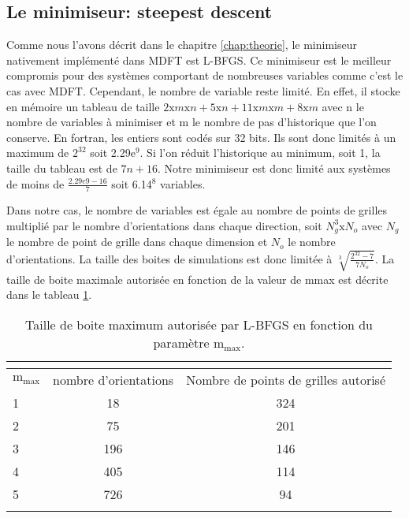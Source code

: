\subsection{Le minimiseur: steepest descent}
Comme nous l'avons décrit dans le chapitre \ref{chap:theorie}, le minimiseur nativement implémenté dans MDFT est L-BFGS. Ce minimiseur est le meilleur compromis pour des systèmes comportant de nombreuses variables comme c'est le cas avec MDFT. Cependant, le nombre de variable reste limité. En effet, il stocke en mémoire un tableau de taille $2\mathrm{x}m\mathrm{x}n + 5\mathrm{x}n + 11\mathrm{x}m\mathrm{x}m + 8\mathrm{x}m$ avec n le nombre de variables à minimiser et m le nombre de pas d'historique que l'on conserve. En fortran, les entiers sont codés sur 32 bits. Ils sont donc limités à un maximum de $2^{32}$ soit 2.29e$^9$. Si l'on réduit l'historique au minimum, soit 1, la taille du tableau est de $7n+16$. Notre minimiseur est donc limité aux systèmes de moins de $\frac{2.29e9-16}{7}$ soit 6.14$^{8}$ variables. 

Dans notre cas, le nombre de variables est égale au nombre de points de grilles multiplié par le nombre d'orientations dans chaque direction, soit $N_g^3 \mathrm{x} N_o$ avec $N_g$ le nombre de point de grille dans chaque dimension et $N_o$ le nombre d'orientations. La taille des boites de simulations est donc limitée à $\sqrt[3]{\frac{2^{32}-7}{7N_o}}$. La taille de boite maximale autorisée en fonction de la valeur de mmax est décrite dans le tableau \ref{tab:taille_boite_max}.



\begin{table}[H]
 \centering
  \begin{tabular}{l | c | c }
    \hline \multicolumn{3}{c}{} \\[-1em]\hline
    $\mathrm{m}_\mathrm{max}$ & nombre d'orientations & Nombre de points de grilles autorisé \\
    \hline
    1  & 18 & 324 \\
    2  & 75 & 201 \\
    3  & 196 & 146 \\
    4  & 405 & 114 \\
    5  & 726 & 94 \\
    \hline \multicolumn{3}{c}{} \\[-1em]\hline
  \end{tabular}
  \caption{Taille de boite maximum autorisée par L-BFGS en fonction du paramètre $\mathrm{m}_\mathrm{max}$.}
  \label{tab:taille_boite_max}  
\end{table}


